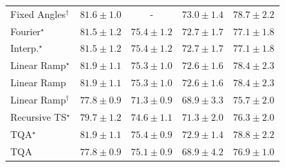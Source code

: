 \begin{tabular}{l|cccc|}
Fixed Angles$^\dagger$ & {\cellcolor[HTML]{00492B}} \color[HTML]{F1F1F1} $81.6\pm 1.0$ & {\cellcolor[HTML]{000000}} \color[HTML]{F1F1F1} {\cellcolor{white}} \color{black} - & {\cellcolor[HTML]{49AF61}} \color[HTML]{F1F1F1} $73.0\pm 1.4$ & {\cellcolor[HTML]{056C39}} \color[HTML]{F1F1F1} $78.7\pm 2.2$ \\
Fourier$^\star$ & {\cellcolor[HTML]{004A2B}} \color[HTML]{F1F1F1} $81.5\pm 1.2$ & {\cellcolor[HTML]{2C8F4B}} \color[HTML]{F1F1F1} $75.4\pm 1.2$ & {\cellcolor[HTML]{4EB163}} \color[HTML]{F1F1F1} $72.7\pm 1.7$ & {\cellcolor[HTML]{187B3F}} \color[HTML]{F1F1F1} $77.1\pm 1.8$ \\
Interp.$^\star$ & {\cellcolor[HTML]{004A2B}} \color[HTML]{F1F1F1} $81.5\pm 1.2$ & {\cellcolor[HTML]{2C8F4B}} \color[HTML]{F1F1F1} $75.4\pm 1.2$ & {\cellcolor[HTML]{4EB163}} \color[HTML]{F1F1F1} $72.7\pm 1.7$ & {\cellcolor[HTML]{187B3F}} \color[HTML]{F1F1F1} $77.1\pm 1.8$ \\
Linear Ramp$^\star$ & {\cellcolor[HTML]{004629}} \color[HTML]{F1F1F1} $81.9\pm 1.1$ & {\cellcolor[HTML]{2D914B}} \color[HTML]{F1F1F1} $75.3\pm 1.0$ & {\cellcolor[HTML]{4FB264}} \color[HTML]{F1F1F1} $72.6\pm 1.6$ & {\cellcolor[HTML]{096F3A}} \color[HTML]{F1F1F1} $78.4\pm 2.3$ \\
Linear Ramp & {\cellcolor[HTML]{004629}} \color[HTML]{F1F1F1} $81.9\pm 1.1$ & {\cellcolor[HTML]{2D914B}} \color[HTML]{F1F1F1} $75.3\pm 1.0$ & {\cellcolor[HTML]{4FB264}} \color[HTML]{F1F1F1} $72.6\pm 1.6$ & {\cellcolor[HTML]{096F3A}} \color[HTML]{F1F1F1} $78.4\pm 2.3$ \\
Linear Ramp$^\dagger$ & {\cellcolor[HTML]{10743C}} \color[HTML]{F1F1F1} $77.8\pm 0.9$ & {\cellcolor[HTML]{69BF72}} \color[HTML]{000000} $71.3\pm 0.9$ & {\cellcolor[HTML]{95D385}} \color[HTML]{000000} $68.9\pm 3.3$ & {\cellcolor[HTML]{298C48}} \color[HTML]{F1F1F1} $75.7\pm 2.0$ \\
Recursive TS$^\star$ & {\cellcolor[HTML]{006034}} \color[HTML]{F1F1F1} $79.7\pm 1.2$ & {\cellcolor[HTML]{349A52}} \color[HTML]{F1F1F1} $74.6\pm 1.1$ & {\cellcolor[HTML]{69BF72}} \color[HTML]{000000} $71.3\pm 2.0$ & {\cellcolor[HTML]{228343}} \color[HTML]{F1F1F1} $76.3\pm 2.0$ \\
TQA$^\star$ & {\cellcolor[HTML]{004629}} \color[HTML]{F1F1F1} $81.9\pm 1.1$ & {\cellcolor[HTML]{2C8F4B}} \color[HTML]{F1F1F1} $75.4\pm 0.9$ & {\cellcolor[HTML]{4AB062}} \color[HTML]{F1F1F1} $72.9\pm 1.4$ & {\cellcolor[HTML]{036B38}} \color[HTML]{F1F1F1} $78.8\pm 2.2$ \\
TQA & {\cellcolor[HTML]{10743C}} \color[HTML]{F1F1F1} $77.8\pm 0.9$ & {\cellcolor[HTML]{2F934D}} \color[HTML]{F1F1F1} $75.1\pm 0.9$ & {\cellcolor[HTML]{95D385}} \color[HTML]{000000} $68.9\pm 4.2$ & {\cellcolor[HTML]{1A7D40}} \color[HTML]{F1F1F1} $76.9\pm 1.0$ \\

\end{tabular}
